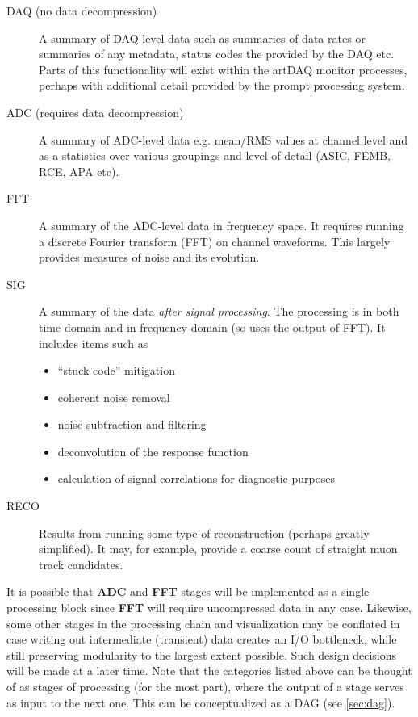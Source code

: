 \documentclass[pdftex,12pt,letter]{article}
\begin{document}
\begin{description}

\item[DAQ (no data decompression)] A summary of DAQ-level data  such as summaries of data
 rates  or summaries of any metadata, status codes the provided by the DAQ etc.
Parts of this functionality will exist within the artDAQ monitor processes, perhaps with
additional detail provided by the prompt processing system.

\item[ADC (requires data decompression)] A summary of ADC-level data e.g. mean/RMS
values at channel level and as a statistics over various groupings and level of detail
(ASIC, FEMB, RCE, APA etc).


\item[FFT] A summary of the ADC-level data in frequency space. It requires running a discrete Fourier
transform (FFT) on channel waveforms. This largely  provides measures of noise and its
evolution.

\item[SIG] A summary of the data \textit{after signal processing}.
The processing is in  both time domain and in frequency domain (so uses the output of FFT).
It includes items such as
\begin{itemize}
\item ``stuck code'' mitigation
\item coherent noise removal
\item noise subtraction and filtering
\item deconvolution of the response function
\item calculation of signal correlations for diagnostic purposes
\end{itemize}

\item[RECO] Results from running some type of reconstruction (perhaps greatly simplified).
It may, for  example, provide a coarse count of straight muon track candidates.

\end{description}


\noindent It is possible that \textbf{ADC} and \textbf{FFT} stages will be implemented as a single processing
block since \textbf{FFT} will require uncompressed data in any case. Likewise, some other stages in the processing
chain and visualization may be conflated in case writing out intermediate (transient) data creates an I/O bottleneck,
while still preserving modularity to the largest extent possible. Such design decisions will be made at a later time.
Note that the categories listed above can be thought of as stages of processing (for the most part), where
the output of a stage serves as input to the next one. This can be conceptualized as a DAG (see \ref{sec:dag}).
\end{document}
